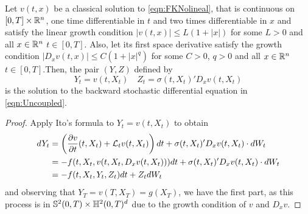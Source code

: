 \begin{theorem}
	\label{thm:verficationThm}
	Let $v(t,x)$ be a classical solution to \ref{eqn:FKNolineal}, that is continuous on $[0,T]\times \mathbb{R}^n$, one time differentiable in $t$ and two times differentiable in $x$ and satisfy the linear growth condition $|v(t,x)|\leq L(1+|x|)$ for some $L>0$ and all $x\in\mathbb{R}^n$ $t\in[0,T]$. Also, let its first space derivative satisfy the growth condition $|D_x v(t,x)|\leq C(1+|x|^q)$ for some $C>0$, $q>0$ and all $x\in\mathbb{R}^n$ $t\in[0,T]$.Then, the pair $(Y,Z)$ defined by
	\begin{equation}
		Y_t=v(t,X_t) \quad Z_t=\sigma(t,X_t)' D_x v(t,X_t)
	\end{equation}
is the solution to the backward stochastic differential equation in \ref{eqn:Uncoupled}.
\end{theorem}
\begin{proof}
	Apply Ito's formula to $Y_t=v(t,X_t)$ to obtain
	\begin{equation}
		\begin{split}
		dY_t&=\left(\frac{\partial v}{\partial t}(t,X_t)+\mathcal{L}_t v(t,X_t)\right)dt+\sigma(t,X_t)' D_x v(t,X_t)\cdot dW_t\\
		&=-f(t,X_t,v(t,X_t,D_x v(t,X_t)))dt+\sigma(t,X_t)' D_x v(t,X_t) \cdot dW_t\\
		&=-f(t,X_t,Y_t,Z_t)dt+Z_t dW_t
		\end{split}
	\end{equation}
and observing that $Y_T=v(T,X_T)=g(X_T)$, we have the first part, as this process is in $\mathbb{S}^2(0,T)\times \mathbb{H}^2(0,T)^d$ due to the growth condition of $v$ and $D_x v$.
\end{proof}


